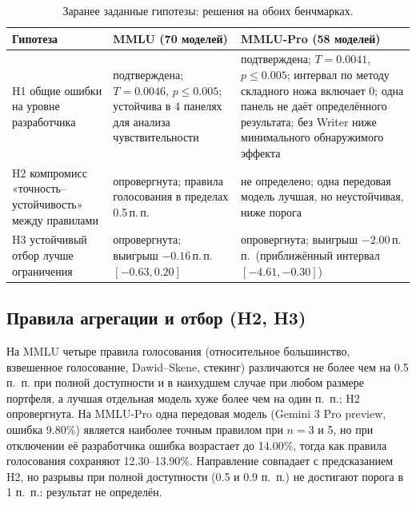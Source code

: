 \documentclass[preprint,12pt,authoryear]{elsarticle}
\newcommand{\pp}{\,п.\,п.}
\begin{document}
\begin{table}[!htbp]
\centering
\caption{Заранее заданные гипотезы: решения на обоих бенчмарках.}
\label{tab:hyp}
\small
\begin{tabular}{@{}p{3.4cm}p{4.6cm}p{4.6cm}@{}}
\toprule
Гипотеза & MMLU (70 моделей) & MMLU-Pro (58 моделей) \\
\midrule
H1 общие ошибки на уровне разработчика & подтверждена; $T=0.0046$, $p\le0.005$; устойчива в 4 панелях для анализа чувствительности & подтверждена; $T=0.0041$, $p\le0.005$; интервал по методу складного ножа включает 0; одна панель не даёт определённого результата; без Writer ниже минимального обнаружимого эффекта \\
H2 компромисс «точность--устойчивость» между правилами & опровергнута; правила голосования в пределах 0.5\pp & не определено; одна передовая модель лучшая, но неустойчивая, ниже порога \\
H3 устойчивый отбор лучше ограничения & опровергнута; выигрыш $-0.16$\pp\ $[-0.63, 0.20]$ & опровергнута; выигрыш $-2.00$\pp\ (приближённый интервал $[-4.61, -0.30]$) \\
\bottomrule
\end{tabular}
\end{table}

\subsection{Правила агрегации и отбор (H2, H3)}
На MMLU четыре правила голосования (относительное большинство, взвешенное голосование, Dawid--Skene, стекинг) различаются не более чем на 0.5 п.~п. при полной доступности и в наихудшем случае при любом размере портфеля, а лучшая отдельная модель хуже более чем на один п.~п.; H2 опровергнута. На MMLU-Pro одна передовая модель (Gemini 3 Pro preview, ошибка 9.80\%) является наиболее точным правилом при $n=3$ и 5, но при отключении её разработчика ошибка возрастает до 14.00\%, тогда как правила голосования сохраняют 12.30--13.90\%. Направление совпадает с предсказанием H2, но разрывы при полной доступности (0.5 и 0.9 п.~п.) не достигают порога в 1 п.~п.: результат не определён.
\end{document}
